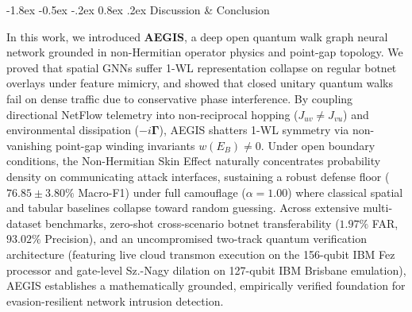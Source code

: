 \documentclass[10pt,twocolumn,letterpaper]{article}
\makeatletter
\renewcommand\section{\@startsection {section}{1}{\z@}%
                                   {-1.8ex \@plus -0.5ex \@minus -.2ex}%
                                   {0.8ex \@plus .2ex}%
                                   {\normalfont\large\bfseries}}
\makeatother
\begin{document}
\section{Discussion \& Conclusion}
\label{sec:conclusion}

In this work, we introduced \textbf{AEGIS}, a deep open quantum walk graph neural network grounded in non-Hermitian operator physics and point-gap topology. We proved that spatial GNNs suffer 1-WL representation collapse on regular botnet overlays under feature mimicry, and showed that closed unitary quantum walks fail on dense traffic due to conservative phase interference. By coupling directional NetFlow telemetry into non-reciprocal hopping ($J_{uv} \ne J_{vu}$) and environmental dissipation ($-i\boldsymbol{\Gamma}$), AEGIS shatters 1-WL symmetry via non-vanishing point-gap winding invariants $w(E_B) \ne 0$. Under open boundary conditions, the Non-Hermitian Skin Effect naturally concentrates probability density on communicating attack interfaces, sustaining a robust defense floor ($76.85 \pm 3.80\%$ Macro-F1) under full camouflage ($\alpha = 1.00$) where classical spatial and tabular baselines collapse toward random guessing. Across extensive multi-dataset benchmarks, zero-shot cross-scenario botnet transferability ($1.97\%$ FAR, $93.02\%$ Precision), and an uncompromised two-track quantum verification architecture (featuring live cloud transmon execution on the 156-qubit IBM Fez processor and gate-level Sz.-Nagy dilation on 127-qubit IBM Brisbane emulation), AEGIS establishes a mathematically grounded, empirically verified foundation for evasion-resilient network intrusion detection.

\let\oldbibliography\thebibliography
\renewcommand{\thebibliography}[1]{%
  \oldbibliography{#1}%
  \scriptsize
  \setlength{\itemsep}{-5.0pt plus 0.2pt}%
  \setlength{\parsep}{0pt}%
  \setlength{\parskip}{0pt}%
}


\end{document}
